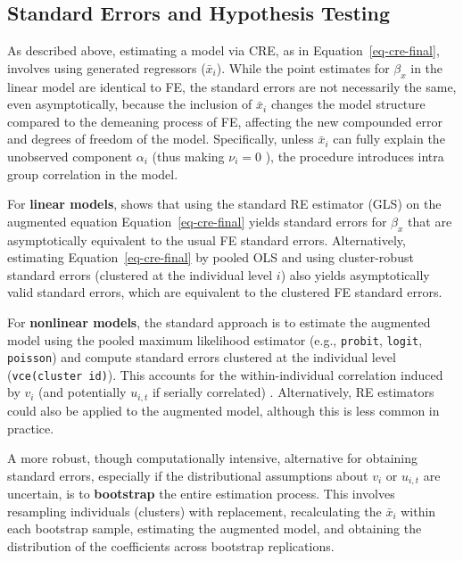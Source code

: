 \documentclass[bib]{statapress}
\begin{document}
\subsection{Standard Errors and Hypothesis Testing}\label{sec-2-3}

As described above, estimating a model via CRE, as in
Equation~\ref{eq-cre-final}, involves using generated regressors
(\(\bar x_i\)). While the point estimates for \(\beta_x\) in the linear
model are identical to FE, the standard errors are not necessarily the
same, even asymptotically, because the inclusion of \(\bar x_i\) changes
the model structure compared to the demeaning process of FE, affecting
the new compounded error and degrees of freedom of the model.
Specifically, unless \(\bar x_i\) can fully explain the unobserved
component \(\alpha_i\) (thus making \(\nu_i=0\) ), the procedure
introduces intra group correlation in the model.

For \textbf{linear models}, \citet[chap
10.5.3]{wooldridge2010econometric} shows that using the standard RE
estimator (GLS) on the augmented equation Equation~\ref{eq-cre-final}
yields standard errors for \(\beta_x\) that are asymptotically
equivalent to the usual FE standard errors. Alternatively, estimating
Equation~\ref{eq-cre-final} by pooled OLS and using cluster-robust
standard errors (clustered at the individual level \(i\)) also yields
asymptotically valid standard errors, which are equivalent to the
clustered FE standard errors.

For \textbf{nonlinear models}, the standard approach is to estimate the
augmented model using the pooled maximum likelihood estimator (e.g.,
\texttt{probit}, \texttt{logit}, \texttt{poisson}) and compute standard
errors clustered at the individual level (\texttt{vce(cluster\ id)}).
This accounts for the within-individual correlation induced by \(v_i\)
(and potentially \(u_{i,t}\) if serially correlated) \citep[ chap
15.8]{wooldridge2010econometric}. Alternatively, RE estimators could
also be applied to the augmented model, although this is less common in
practice.

A more robust, though computationally intensive, alternative for
obtaining standard errors, especially if the distributional assumptions
about \(v_i\) or \(u_{i,t}\) are uncertain, is to \textbf{bootstrap} the
entire estimation process. This involves resampling individuals
(clusters) with replacement, recalculating the \(\bar x_i\) within each
bootstrap sample, estimating the augmented model, and obtaining the
distribution of the coefficients across bootstrap replications.
\end{document}
